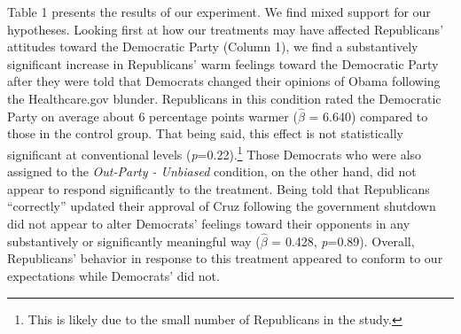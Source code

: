 \documentclass[12pt, letterpaper]{article}
\begin{document}
Table 1 presents the results of our experiment. We find mixed support for our hypotheses. Looking first at how our treatments may have affected Republicans' attitudes toward the Democratic Party (Column 1), we find a substantively significant increase in Republicans' warm feelings toward the Democratic Party after they were told that Democrats changed their opinions of Obama following the Healthcare.gov blunder. Republicans in this condition rated the Democratic Party on average about 6 percentage points warmer ($\hat{\beta}$ = 6.640) compared to those in the control group. That being said, this effect is not statistically significant at conventional levels (\textit{p}=0.22).\footnote{This is likely due to the small number of Republicans in the study.} Those Democrats who were also assigned to the \textit{Out-Party - Unbiased} condition, on the other hand, did not appear to respond significantly to the treatment. Being told that Republicans  ``correctly'' updated their approval of Cruz following the government shutdown did not appear to alter Democrats' feelings toward their opponents in any substantively or significantly meaningful way ($\hat{\beta}$ = 0.428, \textit{p}=0.89). Overall, Republicans' behavior in response to this treatment appeared to conform to our expectations while Democrats' did not.
\end{document}
